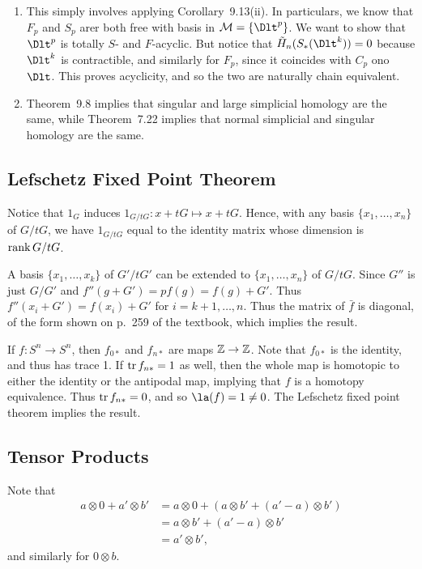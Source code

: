\documentclass[../../solutions.tex]{subfiles}
\begin{document}
\begin{exercise} \leavevmode
\begin{enumerate}
\item
This simply involves applying Corollary~9.13(ii).
In particulars, we know that $F_p$ and $S_p$ arer both free with basis in $\mathcal M=\{\Dlt^p\}$.
We want to show that $\Dlt^p$ is totally $S$- and $F$-acyclic.
But notice that $\tilde H_n(S_*(\Dlt^k))=0$ because $\Dlt^k$ is contractible, and similarly for $F_p$, since it coincides with $C_p$ ono $\Dlt$.
This proves acyclicity, and so the two are naturally chain equivalent.

\item
Theorem~9.8 implies that singular and large simplicial homology are the same, while Theorem~7.22 implies that normal simplicial and singular homology are the same.
\end{enumerate}
\end{exercise}

\subsection{Lefschetz Fixed Point Theorem}
\begin{exercise} \leavevmode
Notice that $1_G$ induces $1_{G/tG}:x+tG\mapsto x+tG$.
Hence, with any basis $\{x_1,\dots,x_n\}$ of $G/tG$, we have $1_{G/tG}$ equal to the identity matrix whose dimension is $\operatorname{rank} G/tG$.
\end{exercise}

\begin{exercise} \leavevmode
A basis $\{x_1,\dots,x_k\}$ of $G'/tG'$ can be extended to $\{x_1,\dots,x_n\}$ of $G/tG$.
Since $G''$ is just $G/G'$ and $f''(g+G')=pf(g)=f(g)+G'$.
Thus $f''(x_i+G')=f(x_i)+G'$ for $i=k+1,\dots,n$.
Thus the matrix of $\bar f$ is diagonal, of the form shown on p.~259 of the textbook, which implies the result.
\end{exercise}

\begin{exercise} \leavevmode
If $f:S^n\to S^n$, then $f_{0*}$ and $f_{n*}$ are maps $\mathbb{Z}\to\mathbb{Z}$.
Note that $f_{0*}$ is the identity, and thus has trace 1.
If $\operatorname{tr} f_{n*}=1$ as well, then the whole map is homotopic to either the identity or the antipodal map, implying that $f$ is a homotopy equivalence.
Thus $\operatorname{tr} f_{n*}=0$, and so $\la(f)=1\ne0$.
The Lefschetz fixed point theorem implies the result.
\end{exercise}

\subsection{Tensor Products}
\begin{exercise} \leavevmode
Note that
\begin{align*}
a\otimes0+a'\otimes b'&=a\otimes0+(a\otimes b'+(a'-a)\otimes b')\\
&=a\otimes b'+(a'-a)\otimes b'\\
&=a'\otimes b',
\end{align*}
and similarly for $0\otimes b$.
\end{exercise}
\end{document}
